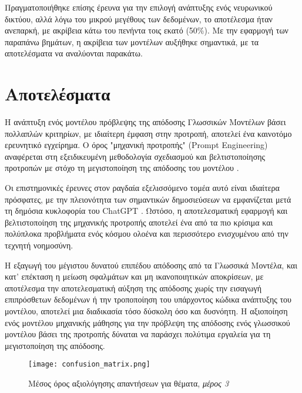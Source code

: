 Πραγματοποιήθηκε επίσης έρευνα για την επιλογή ανάπτυξης ενός νευρωνικού
δικτύου, αλλά λόγω του μικρού μεγέθους των δεδομένων, το αποτέλεσμα ήταν
ανεπαρκή, με ακρίβεια κάτω του πενήντα τοις εκατό (50\%). Με την
εφαρμογή των παραπάνω βημάτων, η ακρίβεια των μοντέλων αυξήθηκε
σημαντικά, με τα αποτελέσματα να αναλύονται παρακάτω.

\section{Αποτελέσματα}

Η ανάπτυξη ενός μοντέλου πρόβλεψης της απόδοσης Γλωσσικών Μοντέλων βάσει
πολλαπλών κριτηρίων, με ιδιαίτερη έμφαση στην προτροπή, αποτελεί ένα
καινοτόμο ερευνητικό εγχείρημα. Ο όρος "μηχανική προτροπής"
(\textlatin{Prompt Engineering}) αναφέρεται στη εξειδικευμένη
μεθοδολογία σχεδιασμού και βελτιστοποίησης προτροπών με στόχο τη
μεγιστοποίηση της απόδοσης του μοντέλου \cite{10.1162/tacl_a_00324,
  chen2024unleashingpotentialpromptengineering}.

Οι επιστημονικές έρευνες στον ραγδαία εξελισσόμενο τομέα αυτό είναι
ιδιαίτερα πρόσφατες, με την πλειονότητα των σημαντικών δημοσιεύσεων να
εμφανίζεται μετά τη δημόσια κυκλοφορία του \textlatin{ChatGPT}
\cite{greshake2023youvesignedforcompromising,
  white2023promptpatterncatalogenhance}. Ωστόσο, η αποτελεσματική
εφαρμογή και βελτιστοποίηση της μηχανικής προτροπής αποτελεί ένα από τα
πιο κρίσιμα και πολύπλοκα προβλήματα ενός κόσμου ολοένα και περισσότερο
ενισχυμένου από την τεχνητή νοημοσύνη.

Η εξαγωγή του μέγιστου δυνατού επιπέδου απόδοσης από τα Γλωσσικά
Μοντέλα, και κατ' επέκταση η μείωση σφαλμάτων και μη ικανοποιητικών
αποκρίσεων, με αποτέλεσμα την αποτελεσματική αύξηση της απόδοσης χωρίς
την εισαγωγή επιπρόσθετων δεδομένων ή την τροποποίηση του υπάρχοντος
κώδικα ανάπτυξης του μοντέλου, αποτελεί μια διαδικασία τόσο δύσκολη όσο
και δυσνόητη. Η αξιοποίηση ενός μοντέλου μηχανικής μάθησης για την
πρόβλεψη της απόδοσης ενός γλωσσικού μοντέλου βάσει της προτροπής
δύναται να παράσχει πολύτιμα εργαλεία για τη μεγιστοποίηση της απόδοσης.

\begin{figure}[H]
  \begin{center}
    \texttt{[image: confusion\_matrix.png]}
    \caption{Μέσος όρος αξιολόγησης απαντήσεων για θέματα, \textit{μέρος
        3}}
  \end{center}
  \label{fig:SubjectQuery3}
\end{figure}
